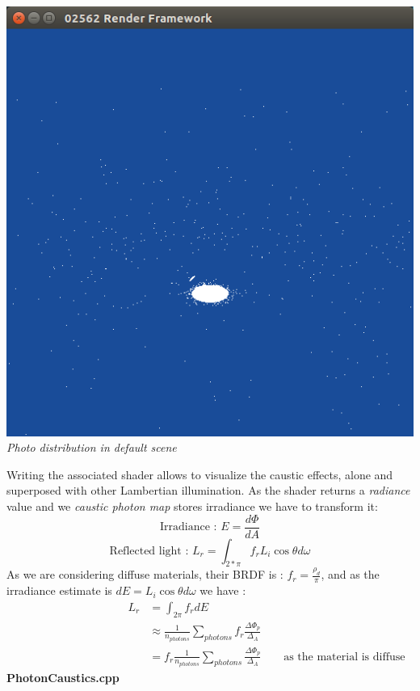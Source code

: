 \documentclass[a4,12pt]{article}
\begin{document}
	\begin{center}
		\begin{minipage}[b]{0.40\linewidth}
			\begin{center}
				\includegraphics[width = \textwidth]{./Worksheet7/causticphotons.png}\\
				\textit{Photo distribution in default scene}
			\end{center}
		\end{minipage}
	\end{center}
	
	Writing the associated shader allows to visualize the caustic effects, alone and superposed with other Lambertian illumination. As the shader returns a \textit{radiance} value and we \textit{caustic photon map} stores irradiance we have to transform it:
	$$
	\text{Irradiance : } E = \frac{d\Phi}{dA}
	$$
	$$
	\text{Reflected light : } L_r = \int_{2*\pi} f_r L_i \cos{\theta} d\omega
	$$
	As we are considering diffuse materials, their BRDF is : $ f_r = \frac{\rho_d}{\pi}$, and as the irradiance estimate is $dE = L_i \cos{\theta} d\omega$ we have :
	\begin{align*}
	\hspace{10em} L_r &= \int_{2\pi} f_r dE\\
	&\approx \frac{1}{n_{photons}} \sum_{photons} f_r \frac{\Delta \Phi_p}{\Delta_A}\\
	&= f_r \frac{1}{n_{photons}} \sum_{photons} \frac{\Delta \Phi_p}{\Delta_A} \hspace{2em} \text{as the material is diffuse}
	\end{align*}
	\textbf{PhotonCaustics.cpp}
	
\end{document}
